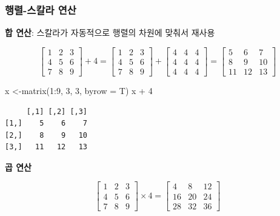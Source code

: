 \documentclass[
  11pt,
]{krantz}
\newenvironment{Shaded}{\begin{snugshade}}{\end{snugshade}}
\newcommand{\AttributeTok}[1]{\textcolor[rgb]{0.61,0.61,0.61}{#1}}
\newcommand{\DecValTok}[1]{\textcolor[rgb]{0.06,0.06,0.06}{#1}}
\newcommand{\FunctionTok}[1]{\textcolor[rgb]{0,0,0}{#1}}
\newcommand{\NormalTok}[1]{#1}
\newcommand{\OtherTok}[1]{\textcolor[rgb]{0.37,0.37,0.37}{#1}}
\newcommand{\SpecialCharTok}[1]{\textcolor[rgb]{0,0,0}{#1}}
\begin{document}
\hypertarget{mat-op-s}{%
\subsubsection*{\texorpdfstring{\textbf{행렬-스칼라 연산}}{행렬-스칼라 연산}}\label{mat-op-s}}


\textbf{합 연산}: 스칼라가 자동적으로 행렬의 차원에 맞춰서 재사용

\[\begin{bmatrix}
1 & 2 & 3 \\
4 & 5 & 6 \\ 
7 & 8 & 9
\end{bmatrix} + 4 = 
\begin{bmatrix}
1 & 2 & 3 \\
4 & 5 & 6 \\ 
7 & 8 & 9
\end{bmatrix} + 
\begin{bmatrix}
4 & 4 & 4 \\
4 & 4 & 4 \\ 
4 & 4 & 4
\end{bmatrix} = 
\begin{bmatrix}
5 &  6  & 7 \\
8 &  9  & 10 \\ 
11 & 12 & 13
\end{bmatrix}
\]

\footnotesize

\begin{Shaded}
\begin{Highlighting}[]
\NormalTok{x }\OtherTok{\textless{}{-}}\FunctionTok{matrix}\NormalTok{(}\DecValTok{1}\SpecialCharTok{:}\DecValTok{9}\NormalTok{, }\DecValTok{3}\NormalTok{, }\DecValTok{3}\NormalTok{, }\AttributeTok{byrow =}\NormalTok{ T)}
\NormalTok{x }\SpecialCharTok{+} \DecValTok{4}
\end{Highlighting}
\end{Shaded}

\begin{verbatim}
     [,1] [,2] [,3]
[1,]    5    6    7
[2,]    8    9   10
[3,]   11   12   13
\end{verbatim}

\normalsize

\textbf{곱 연산}

\[\begin{bmatrix}
1 & 2 & 3 \\
4 & 5 & 6 \\ 
7 & 8 & 9
\end{bmatrix} \times 4 = 
\begin{bmatrix}
4  &  8 & 12 \\
16 & 20 & 24 \\ 
28 & 32 & 36
\end{bmatrix} 
\]
\end{document}
